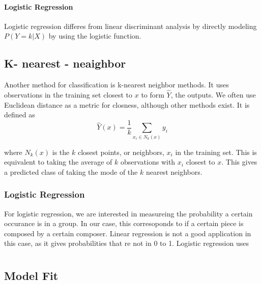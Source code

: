 \documentclass[12pt,twoside]{reedthesis}
\theoremstyle{definition}
\theoremstyle{definition}
\theoremstyle{definition}
\theoremstyle{remark}
\begin{document}
\subsubsection{Logistic Regression}\label{logistic-regression}

Logistic regression differes from linear discriminant analysis by
directly modeling \(P(Y = k|X)\) by using the logistic function.

\section{K- nearest - neaighbor}\label{k--nearest---neaighbor}

Another method for classification is k-nearest neighbor methods. It uses
observations in the training set closest to \(x\) to form \(\hat{Y}\),
the outputs. We often use Euclidean distance as a metric for closness,
although other methods exist. It is defined as
\[ \hat{Y}(x) = \frac{1}{k}\sum_{x_i \in N_k(x)}y_i\]

where \(N_k(x)\) is the \(k\) closest points, or neighbors, \(x_i\) in
the training set. This is equivalent to taking the average of \(k\)
observations with \(x_i\) closest to \(x\). This gives a predicted class
of taking the mode of the \(k\) nearest neighbors.

\subsection{Logistic Regression}\label{logistic-regression-1}

For logistic regression, we are interested in measureing the probability
a certain occurance is in a group. In our case, this corresoponds to if
a certain piece is composed by a certain composer. Linear regression is
not a good application in this case, as it gives probabilities that re
not in 0 to 1. Logistic regression uses

\chapter{}\label{section-4}

\section{Model Fit}\label{model-fit}

\chapter{}\label{section-5}
\end{document}
